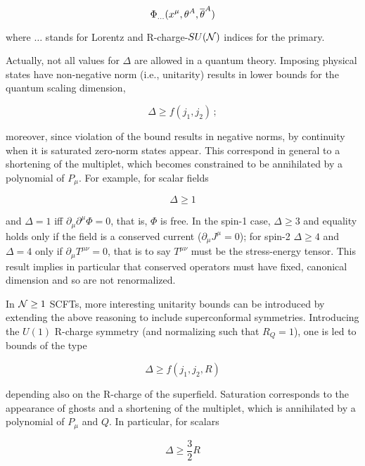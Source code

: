 \begin{equation}
	\Phi_{\ldots} (x^\mu , \theta^A, \overline{\theta}^A)
	\label{}
\end{equation}

where $\ldots$ stands for Lorentz and R-charge-$SU(\mathcal{N})$ indices for the primary.

Actually, not all values for $\Delta$ are allowed in a quantum theory. Imposing physical states have non-negative norm (i.e., unitarity) results in lower bounds for the quantum scaling dimension\cite{unitarity},

\begin{equation}
	\Delta \geq f(j_1,j_2)\,;
	\label{}
\end{equation}

moreover, since violation of the bound results in negative norms, by continuity when it is saturated zero-norm states appear. This correspond in general to a shortening of the multiplet, which becomes constrained to be annihilated by a polynomial of $P_\mu$. For example, for scalar fields

\begin{equation}
	\Delta \geq 1
	\label{uniboundscalar}
\end{equation}

and $\Delta = 1$ iff $\partial_\mu \partial^\mu \Phi = 0$, that is, $\Phi$ is free. In the spin-1 case, $\Delta \geq 3$ and equality holds only if the field is a conserved current ($\partial_\mu J^\mu = 0$); for spin-2 $\Delta \geq 4$ and $\Delta = 4$ only if $\partial_\mu T^{\mu\nu} = 0$, that is to say $T^{\mu\nu}$ must be the stress-energy tensor. This result implies in particular that conserved operators must have fixed, canonical dimension and so are not renormalized.

In $\mathcal{N} \geq 1$ SCFTs, more interesting unitarity bounds can be introduced by extending the above reasoning to include superconformal symmetries. Introducing the $U(1)$ R-charge symmetry (and normalizing such that $R_Q = 1$), one is led to bounds of the type

\begin{equation}
	\Delta \geq f(j_1,j_2,R)
	\label{}
\end{equation}

depending also on the R-charge of the superfield. Saturation corresponds to the appearance of ghosts and a shortening of the multiplet, which is annihilated by a polynomial of $P_\mu$ and $Q$. In particular, for scalars

\begin{equation}
	\Delta \geq \frac{3}{2} R
	\label{}
\end{equation}

